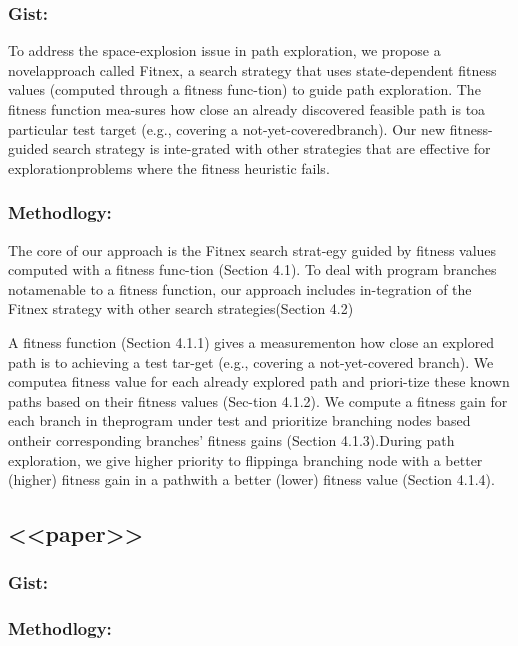 \documentclass[	runningheads,
				a4paper]{llncs}
\begin{document}
\subsubsection{Gist:}
To address the space-explosion  issue  in  path  exploration,  we  propose  a  novelapproach called Fitnex, a search strategy that uses state-dependent fitness values (computed through a fitness func-tion) to guide path exploration.  The fitness function mea-sures how close an already discovered feasible path is toa  particular  test  target  (e.g.,  covering  a  not-yet-coveredbranch).   Our new fitness-guided search strategy is  inte-grated with other strategies that are effective for explorationproblems where the fitness heuristic fails.

\subsubsection{Methodlogy:}
The core of our approach is the Fitnex search strat-egy guided by fitness values computed with a fitness func-tion (Section 4.1).  To deal with program branches notamenable to a fitness function, our approach includes in-tegration of the Fitnex strategy with other search strategies(Section 4.2)

A fitness function (Section 4.1.1) gives a measurementon how close an explored path is to achieving a test tar-get (e.g., covering a not-yet-covered branch). We computea fitness value for each already explored path and priori-tize these known paths based on their fitness values (Sec-tion 4.1.2). We compute a fitness gain for each branch in theprogram under test and prioritize branching nodes based ontheir corresponding branches’ fitness gains (Section 4.1.3).During path exploration, we give higher priority to flippinga branching node with a better (higher) fitness gain in a pathwith a better (lower) fitness value (Section 4.1.4).

\subsection{<<paper>>}
\subsubsection{Gist:}

\subsubsection{Methodlogy:}
\end{document}
